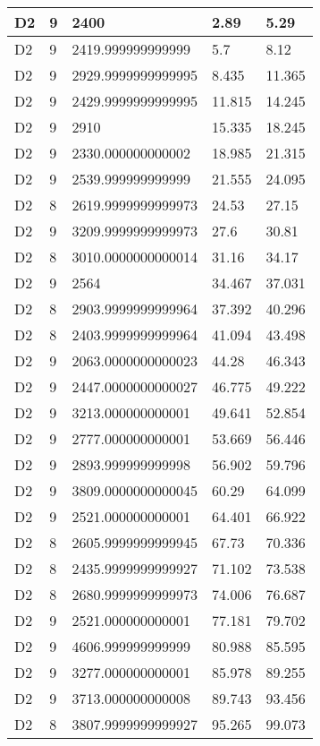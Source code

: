 \begin{longtable}{|l|l|l|l|l|}
D2 & 9 & 2400 & 2.89 & 5.29 \\ \hline
D2 & 9 & 2419.999999999999 & 5.7 & 8.12 \\ \hline
D2 & 9 & 2929.9999999999995 & 8.435 & 11.365 \\ \hline
D2 & 9 & 2429.9999999999995 & 11.815 & 14.245 \\ \hline
D2 & 9 & 2910 & 15.335 & 18.245 \\ \hline
D2 & 9 & 2330.000000000002 & 18.985 & 21.315 \\ \hline
D2 & 9 & 2539.999999999999 & 21.555 & 24.095 \\ \hline
D2 & 8 & 2619.9999999999973 & 24.53 & 27.15 \\ \hline
D2 & 9 & 3209.9999999999973 & 27.6 & 30.81 \\ \hline
D2 & 8 & 3010.0000000000014 & 31.16 & 34.17 \\ \hline
D2 & 9 & 2564 & 34.467 & 37.031 \\ \hline
D2 & 8 & 2903.9999999999964 & 37.392 & 40.296 \\ \hline
D2 & 8 & 2403.9999999999964 & 41.094 & 43.498 \\ \hline
D2 & 9 & 2063.0000000000023 & 44.28 & 46.343 \\ \hline
D2 & 9 & 2447.0000000000027 & 46.775 & 49.222 \\ \hline
D2 & 9 & 3213.000000000001 & 49.641 & 52.854 \\ \hline
D2 & 9 & 2777.000000000001 & 53.669 & 56.446 \\ \hline
D2 & 9 & 2893.999999999998 & 56.902 & 59.796 \\ \hline
D2 & 9 & 3809.0000000000045 & 60.29 & 64.099 \\ \hline
D2 & 9 & 2521.000000000001 & 64.401 & 66.922 \\ \hline
D2 & 8 & 2605.9999999999945 & 67.73 & 70.336 \\ \hline
D2 & 8 & 2435.9999999999927 & 71.102 & 73.538 \\ \hline
D2 & 8 & 2680.9999999999973 & 74.006 & 76.687 \\ \hline
D2 & 9 & 2521.000000000001 & 77.181 & 79.702 \\ \hline
D2 & 9 & 4606.999999999999 & 80.988 & 85.595 \\ \hline
D2 & 9 & 3277.000000000001 & 85.978 & 89.255 \\ \hline
D2 & 9 & 3713.000000000008 & 89.743 & 93.456 \\ \hline
D2 & 8 & 3807.9999999999927 & 95.265 & 99.073 \\ \hline

\end{longtable}

